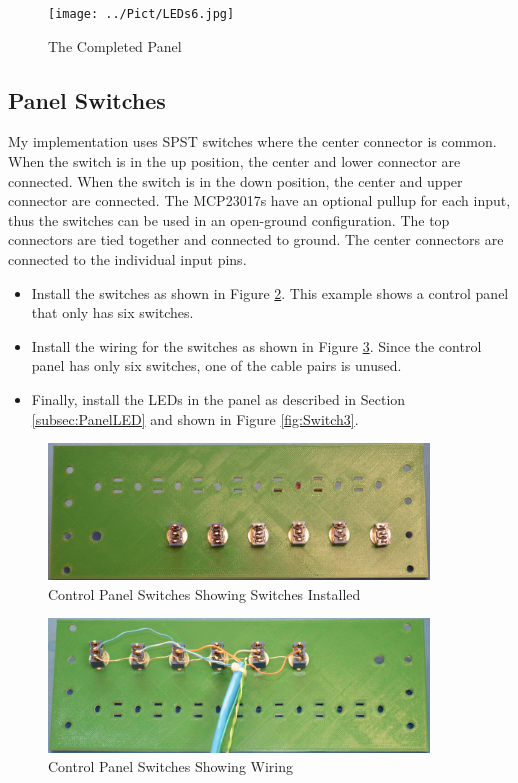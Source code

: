 \documentclass[10pt, openany]{book}
\begin{document}
\begin{figure}[ht!]
  \centering
  \texttt{[image: ../Pict/LEDs6.jpg]}
  \caption{The Completed Panel}
  \label{fig:LED6}
\end{figure}

\clearpage
\subsection{Panel Switches}
My implementation uses SPST switches where the center connector is common.  When the switch is in the up position, the center and lower connector are connected.  When the switch is in the down position, the center and upper connector are connected.  The MCP23017s have an optional pullup for each input, thus the switches can be used in an open-ground configuration.  The top connectors are tied together and connected to ground.  The center connectors are connected to the individual input pins.
\begin{itemize}
  \item Install the switches as shown in Figure \ref{fig:Switch1}.  This example shows a control panel that only has six switches.
  \item Install the wiring for the switches as shown in Figure \ref{fig:Switch2}.  Since the control panel has only six switches, one of the cable pairs is unused.
  \item Finally, install the LEDs in the panel as described in Section \ref{subsec:PanelLED} and shown in Figure \ref{fig:Switch3}.
\end{itemize}
\begin{figure}[ht!]
  \centering
  \includegraphics[width=0.9\textwidth]{../Pict/Switch1.jpg}
  \caption{Control Panel Switches Showing Switches Installed}
  \label{fig:Switch1}
\end{figure}

\begin{figure}[ht!]
  \centering
  \includegraphics[width=0.9\textwidth]{../Pict/Switch2.jpg}
  \caption{Control Panel Switches Showing Wiring}
  \label{fig:Switch2}
\end{figure}
\end{document}
